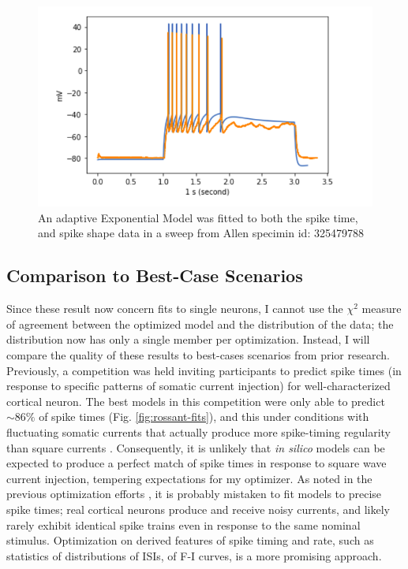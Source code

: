 \begin{figure}
    \centering
    \includegraphics[scale=1]{figures/adexp_fit_allen_specid_325479788.png}
    \caption[Optimized AdEx model from Allen Cell Types (C)]{ An adaptive Exponential Model was fitted to both the spike time, and spike shape data in a sweep from Allen specimin id: 325479788}
    \label{fig:specimen_325479788}
\end{figure}

\subsection{Comparison to Best-Case Scenarios}
Since these result now concern fits to single neurons, I cannot use the $\chi^2$ measure of agreement between the optimized model and the distribution of the data; the distribution now has only a single member per optimization.
Instead, I will compare the quality of these results to best-cases scenarios from prior research.
Previously, a competition was held \citep{naud} inviting participants to predict spike times (in response to specific patterns of somatic current injection) for well-characterized cortical neuron.
The best models in this competition were only able to predict $\sim86\%$ of spike times (Fig. \ref{fig:rossant-fits}), and this under conditions with fluctuating somatic currents that actually produce more spike-timing regularity than square currents \citep{mainen}.
Consequently, it is unlikely that \emph{in silico} models can be expected to produce a perfect match of spike times in response to square wave current injection, tempering expectations for my optimizer.
As noted in the previous optimization efforts \citep{druckmann2007novel}, it is probably mistaken to fit models to precise spike times; real cortical neurons produce and receive noisy currents, and likely rarely exhibit identical spike trains even in response to the same nominal stimulus.
Optimization on derived features of spike timing and rate, such as statistics of distributions of ISIs, of F-I curves, is a more promising approach.

